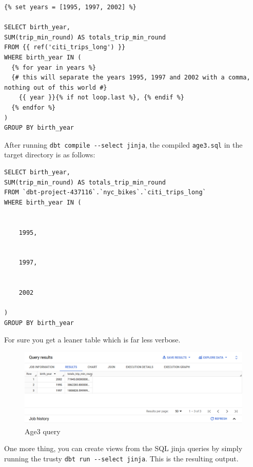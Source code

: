 \documentclass[
]{book}
\begin{document}
\begin{verbatim}
{% set years = [1995, 1997, 2002] %}

SELECT birth_year, 
SUM(trip_min_round) AS totals_trip_min_round
FROM {{ ref('citi_trips_long') }}
WHERE birth_year IN (
  {% for year in years %}
  {# this will separate the years 1995, 1997 and 2002 with a comma, nothing out of this world #}
    {{ year }}{% if not loop.last %}, {% endif %}
  {% endfor %}
)
GROUP BY birth_year
\end{verbatim}

After running \texttt{dbt\ compile\ -\/-select\ jinja}, the compiled \texttt{age3.sql} in the target directory is as follows:

\begin{verbatim}
SELECT birth_year, 
SUM(trip_min_round) AS totals_trip_min_round
FROM `dbt-project-437116`.`nyc_bikes`.`citi_trips_long`
WHERE birth_year IN (
  
  
    1995, 
  
  
    1997, 
  
  
    2002
  
)
GROUP BY birth_year
\end{verbatim}

For sure you get a leaner table which is far less verbose.

\begin{figure}
\centering
\includegraphics{./images/age3_query.png}
\caption{Age3 query}
\end{figure}

One more thing, you can create views from the SQL jinja queries by simply running the trusty \texttt{dbt\ run\ -\/-select\ jinja}. This is the resulting output.
\end{document}
